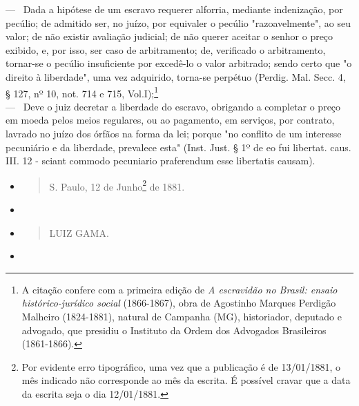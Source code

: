 --- ~Dada a hipótese de um escravo requerer alforria, mediante
indenização, por pecúlio; de admitido ser, no juízo, por equivaler o
pecúlio "razoavelmente", ao seu valor; de não existir avaliação
judicial; de não querer aceitar o senhor o preço exibido, e, por isso,
ser caso de arbitramento; de, verificado o arbitramento, tornar-se o
pecúlio insuficiente por excedê-lo o valor arbitrado; sendo certo que "o
direito à liberdade", uma vez adquirido, torna-se perpétuo (Perdig. Mal.
Secc. 4, § 127, nº 10, not. 714 e 715, Vol.I);\footnote{A citação
  confere com a primeira edição de \emph{A escravidão no Brasil: ensaio
  histórico-jurídico social} (1866-1867), obra de Agostinho Marques
  Perdigão Malheiro (1824-1881), natural de Campanha (MG), historiador,
  deputado e advogado, que presidiu o Instituto da Ordem dos Advogados
  Brasileiros (1861-1866).}\\
--- ~Deve o juiz decretar a liberdade do escravo, obrigando a completar
o preço em moeda pelos meios regulares, ou ao pagamento, em serviços,
por contrato, lavrado no juízo dos órfãos na forma da lei; porque "no
conflito de um interesse pecuniário e da liberdade, prevalece esta"
(Inst. Just. § 1º de eo fui libertat. caus. III. 12 - sciant commodo
pecuniario praferendum esse libertatis causam).

\begin{itemize}
\item
  \begin{quote}
  S. Paulo, 12 de Junho\footnote{Por evidente erro tipográfico, uma
    vez que a publicação é de 13/01/1881, o mês indicado não corresponde
    ao mês da escrita. É possível cravar que a data da escrita seja o
    dia 12/01/1881.} de
  1881.
  \end{quote}
\item
\item
  \begin{quote}
  LUIZ GAMA.
  \end{quote}
\item
\end{itemize}

\pagebreak
\mbox{}\vfill
\thispagestyle{empty}

